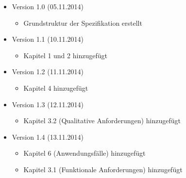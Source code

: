 \documentclass[11pt]{article}
\begin{document}
\begin{itemize}
	\item Version 1.0 (05.11.2014)
	\begin{itemize}
		\item Grundstruktur der Spezifikation erstellt
	\end{itemize}
	\item Version 1.1 (10.11.2014)
	\begin{itemize}
		\item Kapitel 1 und 2 hinzugefügt
	\end{itemize}
	\item Version 1.2 (11.11.2014)
	\begin{itemize}	
		\item Kapitel 4 hinzugefügt
	\end{itemize}
	\item Version 1.3 (12.11.2014)
	\begin{itemize}
		\item Kapitel 3.2 (Qualitative Anforderungen) hinzugefügt
	\end{itemize}
	\item Version 1.4 (13.11.2014)
	\begin{itemize}
		\item Kapitel 6 (Anwendungsfälle) hinzugefügt
		\item Kapitel 3.1 (Funktionale Anforderungen) hinzugefügt
	\end{itemize}
\end{itemize}
\end{document}
